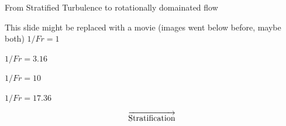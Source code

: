 \documentclass{beamer}
\begin{document}
\begin{frame}{From Stratified Turbulence to rotationally domainated flow}
    \centering

    This slide might be replaced with a movie (images went below before, maybe
    both)
        \centering
        $1/Fr = 1$
        \vspace{2pt}
        
    \emp
    \hspace{1pt}
        \centering
        $1/Fr = 3.16$
        \vspace{2pt}
        
    \emp
    \hspace{1pt}
        \centering
        $1/Fr = 10$
        \vspace{2pt}
        
    \emp
    \hspace{1pt}
        \centering
        $1/Fr = 17.36$
        \vspace{2pt}
        
    \emp
    \[\overrightarrow{\rm Stratification}\]
\end{frame}
\end{document}
